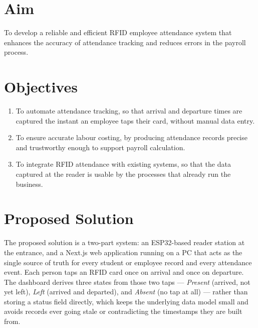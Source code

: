 \section{Aim}

To develop a reliable and efficient RFID employee attendance system that enhances the accuracy of attendance tracking and reduces errors in the payroll process.

\section{Objectives}

\begin{enumerate}[label=\arabic*.]
    \item To automate attendance tracking, so that arrival and departure times are captured the instant an employee taps their card, without manual data entry.
    \item To ensure accurate labour costing, by producing attendance records precise and trustworthy enough to support payroll calculation.
    \item To integrate RFID attendance with existing systems, so that the data captured at the reader is usable by the processes that already run the business.
\end{enumerate}

\section{Proposed Solution}

The proposed solution is a two-part system: an ESP32-based reader station at the entrance, and a Next.js web application running on a PC that acts as the single source of truth for every student or employee record and every attendance event. Each person taps an RFID card once on arrival and once on departure. The dashboard derives three states from those two taps — \textit{Present} (arrived, not yet left), \textit{Left} (arrived and departed), and \textit{Absent} (no tap at all) — rather than storing a status field directly, which keeps the underlying data model small and avoids records ever going stale or contradicting the timestamps they are built from.

